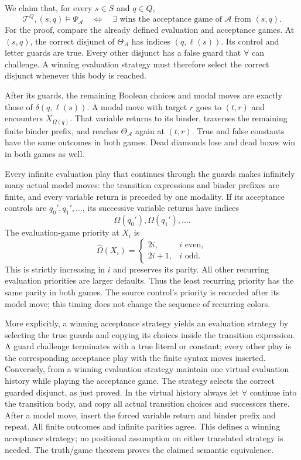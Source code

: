 We claim that, for every \(s\in S\) and \(q\in Q\),
\[
 \mathcal T^Q,(s,q)\models\Psi_{\mathcal A}
 \quad\Longleftrightarrow\quad
 \exists\text{ wins the acceptance game
                   of }\mathcal A\text{ from }(s,q).
\]
For the proof, compare the already defined
evaluation and acceptance games.
At \((s,q)\), the correct disjunct of
\(\Theta_{\mathcal A}\) has indices
\((q,\ell(s))\). Its control and letter
guards are true. Every other disjunct
has a false guard that \(\forall\)
can challenge. A winning evaluation
strategy must therefore select the
correct disjunct whenever this body
is reached.

After its guards, the remaining
Boolean choices and modal moves
are exactly those of
\(\delta(q,\ell(s))\).
A modal move with target \(r\)
goes to \((t,r)\) and encounters
\(X_{\Omega(q)}\). That variable
returns to its binder, traverses
the remaining finite binder prefix,
and reaches \(\Theta_{\mathcal A}\)
again at \((t,r)\).
True and false constants have the
same outcomes in both games.
Dead diamonds lose and dead boxes
win in both games as well.

Every infinite evaluation play
that continues through the guards
makes infinitely many actual model
moves: the transition expressions
and binder prefixes are finite,
and every variable return is
preceded by one modality.
If its acceptance controls are
\(q_0',q_1',\ldots\), its successive
variable returns have indices
\[
 \Omega(q_0'),\Omega(q_1'),\ldots.
\]
The evaluation-game priority at
\(X_i\) is
\[
 \widehat\Omega(X_i)=
 \begin{cases}
   2i,&i\text{ even},\\
   2i+1,&i\text{ odd}.
 \end{cases}
\]
This is strictly increasing in
\(i\) and preserves its parity.
All other recurring evaluation
priorities are larger defaults.
Thus the least recurring priority
has the same parity in both games.
The source control's priority is
recorded after its model move;
this timing does not change the
sequence of recurring colors.

More explicitly, a winning acceptance
strategy yields an evaluation strategy
by selecting the true guards and
copying its choices inside the
transition expression. A guard
challenge terminates with a true
literal or constant; every other play is the
corresponding acceptance play with
the finite syntax moves inserted.
Conversely, from a winning evaluation
strategy maintain one virtual
evaluation history while playing
the acceptance game. The strategy
selects the correct guarded disjunct,
as just proved. In the virtual
history always let \(\forall\)
continue into the transition body,
and copy all actual transition
choices and successors there.
After a model move, insert the
forced variable return and binder
prefix and repeat. All finite
outcomes and infinite parities
agree. This defines a winning
acceptance strategy; no positional
assumption on either translated
strategy is needed.
The truth/game theorem proves
the claimed semantic equivalence.

